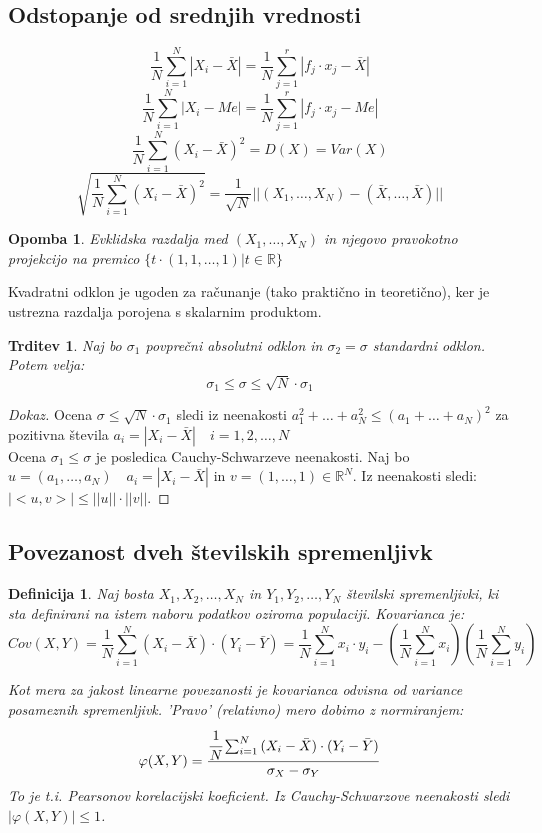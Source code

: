 \documentclass[11pt]{article}
\newtheorem{Trditev}[Izrek]{{\sc Trditev}}
\newtheorem{Definicija}[Izrek]{{\sc Definicija}}
\newtheorem{Opomba}[Izrek]{{\sc Opomba}}
\newenvironment{dokaz}[1][{\sc Dokaz}]{\begin{proof}[#1]\renewcommand*{\qedsymbol}{\(\blacksquare\)}}{\end{proof}}
\begin{document}
\subsection{Odstopanje od srednjih vrednosti}
	$$\frac{1}{N}\sum_{i = 1}^{N}{|X_i - \bar{X}|} = \frac{1}{N}\sum_{j = 1}^{r}{|f_j \cdot x_j - \bar{X}|}$$
	$$\frac{1}{N}\sum_{i = 1}^{N}{|X_i - Me|} = \frac{1}{N}\sum_{j = 1}^{r}{|f_j \cdot x_j - Me|}$$
	$$\frac{1}{N}\sum_{i = 1}^{N}{(X_i - \bar{X})^2} = D(X) = Var(X)$$
	$$\sqrt{\frac{1}{N}\sum_{i = 1}^{N}{(X_i - \bar{X})^2}} = \frac{1}{\sqrt{N}}||(X_1, \ldots ,X_N) - (\bar{X},\ldots ,\bar{X}) || $$
\begin{Opomba}
	Evklidska razdalja med $(X_1, \ldots , X_N) $  in njegovo pravokotno projekcijo na premico $\{ t \cdot (1,1, \ldots, 1) | t\in \mathbb{R} \}$
\end{Opomba}	

Kvadratni odklon je ugoden za računanje (tako praktično in teoretično), ker je ustrezna razdalja porojena s skalarnim produktom.
\begin{Trditev}
	Naj bo $\sigma_1$ povprečni absolutni odklon in $\sigma_2 = \sigma$ standardni odklon. Potem velja:
	$$\sigma_1 \le \sigma \le  \sqrt{N} \cdot \sigma_1$$
\end{Trditev}
\begin{dokaz}
	Ocena $\sigma \le  \sqrt{N} \cdot \sigma_1$ sledi iz neenakosti $a_1^2 +\ldots + a_N^2 \le (a_1 + \ldots + a_N)^2$ za pozitivna števila $a_i = |X_i - \bar{X}| \quad i= 1,2,\ldots,N$
	\\
	Ocena $\sigma_1 \le \sigma$ je posledica Cauchy-Schwarzeve neenakosti. Naj bo $u = (a_1, \ldots, a_N) \quad   a_i = |X_i - \bar{X}|$ in $v= (1,\ldots, 1) \in \mathbb{R}^N$. Iz neenakosti sledi: $|<u,v>| \le||u|| \cdot ||v||$.
\end{dokaz}

\subsection{Povezanost dveh  številskih spremenljivk}
\begin{Definicija}
	Naj bosta $X_1, X_2, \ldots, X_N$ in $Y_1,Y_2,\ldots, Y_N$ številski spremenljivki, ki sta definirani na istem naboru podatkov oziroma populaciji. Kovarianca je:
	$$Cov(X,Y) = \frac{1}{N}\sum_{i = 1}^{N}{(X_i - \bar{X})\cdot (Y_i - \bar{Y})} = \frac{1}{N}\sum_{i = 1}^{N}{x_i \cdot y_i} - \left(\frac{1}{N}  \sum_{i = 1}^{N}{x_i}\right)\left( \frac{1}{N}\sum_{i = 1}^{N}{y_i}\right)$$
	
	Kot mera za jakost linearne povezanosti je kovarianca odvisna od variance posameznih spremenljivk. 'Pravo' (relativno) mero dobimo z normiranjem:
	$$\varphi(X,Y) = \frac{\cfrac{1}{N}\sum_{i = 1}^{N}{(X_i - \bar{X})\cdot (Y_i - \bar{Y})} }{\sigma_X - \sigma_Y}$$
	To je t.i. Pearsonov korelacijski koeficient. Iz Cauchy-Schwarzove neenakosti sledi $|\varphi(X,Y)| \le 1$.
\end{Definicija}
\end{document}
